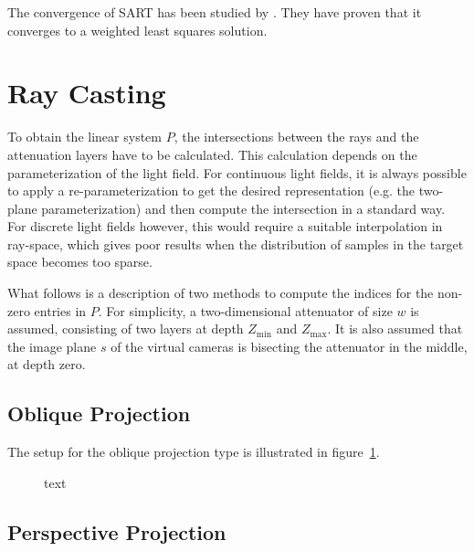 The convergence of \mbox{SART} has been studied by \cite{ConvergenceSART2}.
They have proven that it converges to a weighted least squares solution.

\section{Ray Casting}
\label{sec:ray_casting}

To obtain the linear system $P$, the intersections between the rays and the attenuation layers have to be calculated.
This calculation depends on the parameterization of the light field.
For continuous light fields, it is always possible to apply a re-parameterization to get the desired representation (e.g. the two-plane parameterization) and then compute the intersection in a standard way.
For discrete light fields however, this would require a suitable interpolation in ray-space, which gives poor results when the distribution of samples in the target space becomes too sparse.

What follows is a description of two methods to compute the indices for the non-zero entries in $P$. 
For simplicity, a two-dimensional attenuator of size $w$ is assumed, consisting of two layers at depth $Z_{\text{min}}$ and $Z_{\text{max}}$.
It is also assumed that the image plane $s$ of the virtual cameras is bisecting the attenuator in the middle, at depth zero.

\subsection*{Oblique Projection}

The setup for the oblique projection type is illustrated in figure~\ref{fig:ray_casting_oblique_projection}.

\begin{figure}
	\centering
	
	\caption{text}
	\label{fig:ray_casting_oblique_projection}
\end{figure}


\subsection*{Perspective Projection}

